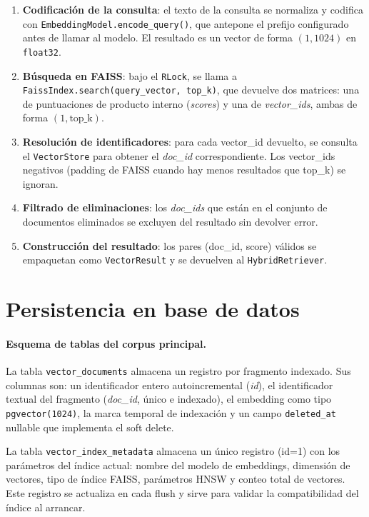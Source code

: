 \documentclass[11pt]{article}
\begin{document}
\begin{enumerate}
\item \textbf{Codificación de la consulta}: el texto de la consulta se normaliza y codifica con
      \texttt{EmbeddingModel.encode\_query()}, que antepone el prefijo configurado antes de
      llamar al modelo. El resultado es un vector de forma $(1, 1024)$ en \texttt{float32}.
\item \textbf{Búsqueda en FAISS}: bajo el \texttt{RLock}, se llama a
      \texttt{FaissIndex.search(query\_vector, top\_k)}, que devuelve dos matrices: una de
      puntuaciones de producto interno (\emph{scores}) y una de \emph{vector\_ids}, ambas de
      forma $(1, \text{top\_k})$.
\item \textbf{Resolución de identificadores}: para cada vector\_id devuelto, se consulta el
      \texttt{VectorStore} para obtener el \emph{doc\_id} correspondiente. Los vector\_ids
      negativos (padding de FAISS cuando hay menos resultados que top\_k) se ignoran.
\item \textbf{Filtrado de eliminaciones}: los \emph{doc\_ids} que están en el conjunto de
      documentos eliminados se excluyen del resultado sin devolver error.
\item \textbf{Construcción del resultado}: los pares (doc\_id, score) válidos se empaquetan
      como \texttt{VectorResult} y se devuelven al \texttt{HybridRetriever}.
\end{enumerate}

\section{Persistencia en base de datos}

\paragraph{Esquema de tablas del corpus principal.}
La tabla \texttt{vector\_documents} almacena un registro por fragmento indexado. Sus columnas
son: un identificador entero autoincremental (\emph{id}), el identificador textual del
fragmento (\emph{doc\_id}, único e indexado), el embedding como tipo \texttt{pgvector(1024)},
la marca temporal de indexación y un campo \texttt{deleted\_at} nullable que implementa el
soft delete.

La tabla \texttt{vector\_index\_metadata} almacena un único registro (id=1) con los
parámetros del índice actual: nombre del modelo de embeddings, dimensión de vectores, tipo
de índice FAISS, parámetros HNSW y conteo total de vectores. Este registro se actualiza en
cada flush y sirve para validar la compatibilidad del índice al arrancar.
\end{document}
